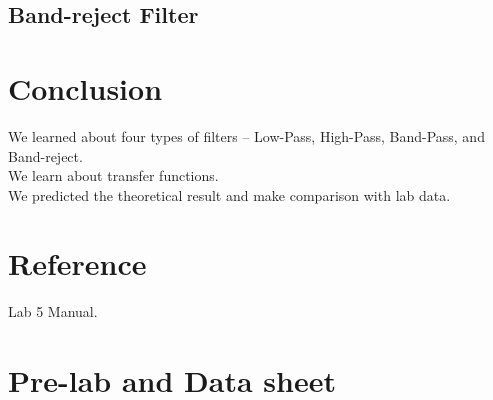 \documentclass{article}
\begin{document}


\subsection{Band-reject Filter}



\newpage

\section{Conclusion}
We learned about four types of filters – Low-Pass, High-Pass, Band-Pass, and Band-reject.\\
We learn about transfer functions.\\
We predicted the theoretical result and make comparison with lab data.

\section{Reference}
Lab 5 Manual.

\section{Pre-lab and Data sheet}
\end{document}
